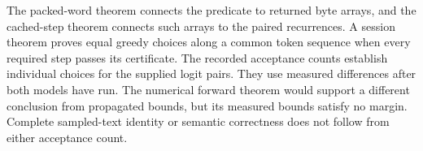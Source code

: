 The packed-word theorem connects the predicate to returned byte arrays, and the cached-step theorem connects such arrays to the paired recurrences.  A session theorem proves equal greedy choices along a common token sequence when every required step passes its certificate.  The recorded acceptance counts establish individual choices for the supplied logit pairs.  They use measured differences after both models have run.  The numerical forward theorem would support a different conclusion from propagated bounds, but its measured bounds satisfy no margin.  Complete sampled-text identity or semantic correctness does not follow from either acceptance count.

